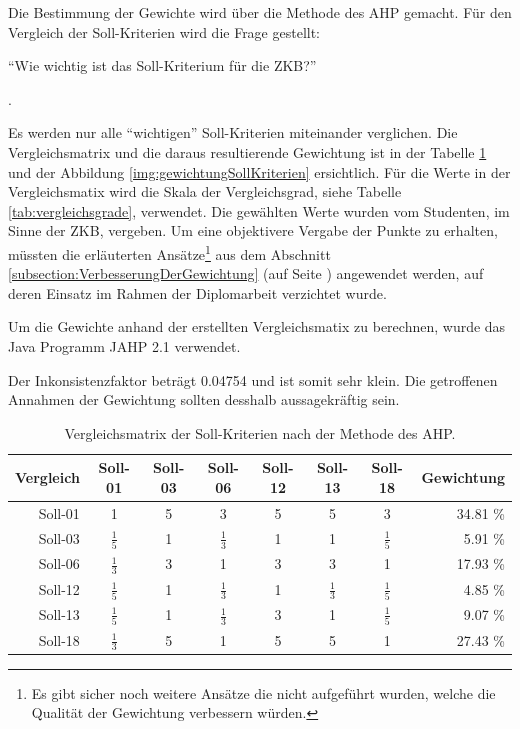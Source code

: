   Die Bestimmung der Gewichte wird über die Methode des \ac{AHP} gemacht. Für
  den Vergleich der Soll-Kriterien wird die Frage gestellt:
  \begin{itshape}``Wie wichtig ist das Soll-Kriterium für die
  \ac{ZKB}?''\end{itshape}.
  
  Es werden nur alle ``wichtigen'' Soll-Kriterien miteinander verglichen. Die
  Vergleichsmatrix und die daraus resultierende Gewichtung ist in der Tabelle
  \ref{tab:gewichtungDerSollKriterien} und der Abbildung
  \ref{img:gewichtungSollKriterien} ersichtlich. Für die Werte in der
  Vergleichsmatix wird die Skala der Vergleichsgrad, siehe Tabelle
  \ref{tab:vergleichsgrade}, verwendet. Die gewählten Werte wurden vom
  Studenten, im Sinne der \ac{ZKB}, vergeben. Um eine objektivere Vergabe der
  Punkte zu erhalten, müssten die erläuterten Ansätze\footnote{Es gibt sicher
  noch weitere Ansätze die nicht aufgeführt wurden, welche die Qualität der
  Gewichtung verbessern würden.} aus dem Abschnitt
  \ref{subsection:VerbesserungDerGewichtung}
   (auf Seite
  \pageref{subsection:VerbesserungDerGewichtung}) angewendet werden, auf deren
  Einsatz im Rahmen der Diplomarbeit verzichtet wurde.
  
  Um die Gewichte anhand der erstellten Vergleichsmatix zu berechnen, wurde das
  Java Programm JAHP 2.1 verwendet.
  
  Der Inkonsistenzfaktor beträgt 0.04754 und ist somit sehr klein. Die
  getroffenen Annahmen der Gewichtung sollten desshalb aussagekräftig sein.
  \newline
  
  \begin{table}[!h]
    \sffamily 
    \begin{center}
      \begin{tabular}{r|cccccc|r}
        \toprule
        Vergleich & Soll-01 & Soll-03 & Soll-06 & Soll-12 & Soll-13 & Soll-18
        & Gewichtung\\
        \midrule
        Soll-01 & 1 & 5 & 3 & 5 & 5 & 3 & 34.81 \%\\
        Soll-03 & $\frac{1}{5}$ & 1 & $\frac{1}{3}$ & 1 & 1 & $\frac{1}{5}$ &
        5.91 \%\\
        Soll-06 & $\frac{1}{3}$ & 3 & 1 & 3 & 3 & 1 & 17.93 \%\\
        Soll-12 & $\frac{1}{5}$ & 1 & $\frac{1}{3}$ & 1 & $\frac{1}{3}$ &
        $\frac{1}{5}$ & 4.85 \% \\
        Soll-13 & $\frac{1}{5}$ & 1 & $\frac{1}{3}$ & 3 & 1 & $\frac{1}{5}$ &
        9.07 \%\\ Soll-18 & $\frac{1}{3}$ & 5 & 1 & 5 & 5 & 1 & 27.43 \%\\
        \bottomrule
      \end{tabular}
      \caption{Vergleichsmatrix der Soll-Kriterien nach der Methode des AHP.}
      \label{tab:gewichtungDerSollKriterien}
    \end{center}
  \end{table}
  
